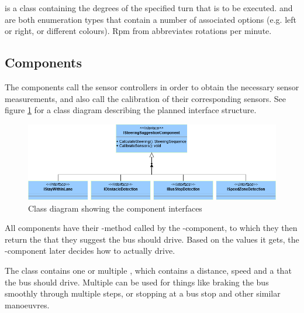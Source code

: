  is a class containing the degrees of the specified turn that is to be executed.  and  are both enumeration types that contain a number of associated options (e.g. left or right, or different colours). Rpm from  abbreviates rotations per minute.

\subsection{Components}
The components call the sensor controllers in order to obtain the necessary sensor measurements, and also call the calibration of their corresponding sensors. See figure \ref{fig:interfaceComponents} for a class diagram describing the planned interface structure.

\begin{figure}[ht]
    \includegraphics[width=\textwidth]{Images/Design/InterfaceComponents.png}
    \caption{Class diagram showing the component interfaces}
    \label{fig:interfaceComponents}
\end{figure}

All components have their -method called by the -component, to which they then return the  that they suggest the bus should drive. Based on the values it gets, the -component later decides how to actually drive. 

The class  contains one or multiple , which contains a distance, speed and a  that the bus should drive. Multiple  can be used for things like braking the bus smoothly through multiple steps, or stopping at a bus stop and other similar manoeuvres. 



